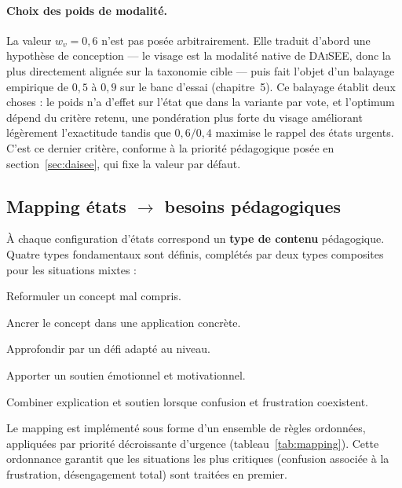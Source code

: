 \paragraph{Choix des poids de modalité.} La valeur $w_v = 0{,}6$ n'est pas posée
arbitrairement. Elle traduit d'abord une hypothèse de conception — le visage est
la modalité native de \textsc{DAiSEE}, donc la plus directement alignée sur la
taxonomie cible — puis fait l'objet d'un balayage empirique de $0{,}5$ à $0{,}9$
sur le banc d'essai (chapitre~5). Ce balayage établit deux choses : le poids
n'a d'effet sur l'état que dans la variante par vote, et l'optimum dépend du
critère retenu, une pondération plus forte du visage améliorant légèrement
l'exactitude tandis que $0{,}6/0{,}4$ maximise le rappel des états urgents. C'est
ce dernier critère, conforme à la priorité pédagogique posée en
section~\ref{sec:daisee}, qui fixe la valeur par défaut.

\subsection{Mapping états $\rightarrow$ besoins pédagogiques}

À chaque configuration d'états correspond un \textbf{type de contenu} pédagogique.
Quatre types fondamentaux sont définis, complétés par deux types composites pour
les situations mixtes :

\begin{description}[leftmargin=2.2em]
  \item[Type A — Explication.] Reformuler un concept mal compris.
  \item[Type B — Exemple.] Ancrer le concept dans une application concrète.
  \item[Type C — Exercice.] Approfondir par un défi adapté au niveau.
  \item[Type D — Encouragement.] Apporter un soutien émotionnel et motivationnel.
  \item[Type A+D / D+A — Composites.] Combiner explication et soutien lorsque
  confusion et frustration coexistent.
\end{description}

Le mapping est implémenté sous forme d'un ensemble de règles ordonnées, appliquées
par priorité décroissante d'urgence (tableau~\ref{tab:mapping}). Cette ordonnance
garantit que les situations les plus critiques (confusion associée à la
frustration, désengagement total) sont traitées en premier.

